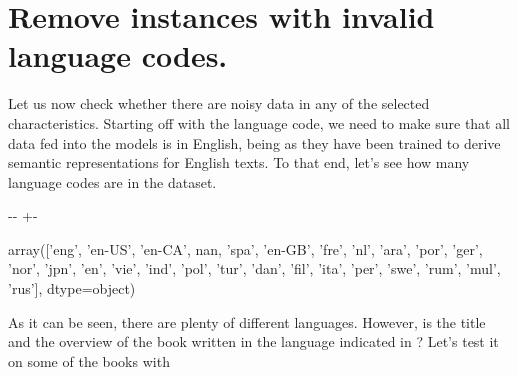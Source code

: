 \documentclass[letterpaper,10pt,english]{sphinxmanual}
\newlength\nbsphinxcodecellspacing
\begin{document}
\section{Remove instances with invalid language codes.}
\label{\detokenize{Data preprocessing:Remove-instances-with-invalid-language-codes.}}
Let us now check whether there are noisy data in any of the selected characteristics. Starting off with the language code, we need to make sure that all data fed into the models is in English, being as they have been trained to derive semantic representations for English texts. To that end, let’s see how many language codes are in the dataset.

{
\begin{sphinxVerbatim}[commandchars=\\\{\}]
\llap{\color{nbsphinxin}[17]:\,\hspace{\fboxrule}\hspace{\fboxsep}}
\end{sphinxVerbatim}
}

{

\kern-\sphinxverbatimsmallskipamount\kern-\baselineskip
\kern+\FrameHeightAdjust\kern-\fboxrule
\vspace{\nbsphinxcodecellspacing}

\begin{sphinxVerbatim}[commandchars=\\\{\}]
\llap{\color{nbsphinxout}[17]:\,\hspace{\fboxrule}\hspace{\fboxsep}}array(['eng', 'en-US', 'en-CA', nan, 'spa', 'en-GB', 'fre', 'nl', 'ara',
       'por', 'ger', 'nor', 'jpn', 'en', 'vie', 'ind', 'pol', 'tur',
       'dan', 'fil', 'ita', 'per', 'swe', 'rum', 'mul', 'rus'],
      dtype=object)
\end{sphinxVerbatim}
}

As it can be seen, there are plenty of different languages. However, is the title and the overview of the book written in the language indicated in ? Let’s test it on some of the books with 

{
\begin{sphinxVerbatim}[commandchars=\\\{\}]
\llap{\color{nbsphinxin}[18]:\,\hspace{\fboxrule}\hspace{\fboxsep}}\PYG{p}{[}  \PYG{p}{]} 
\end{sphinxVerbatim}
}
\end{document}
